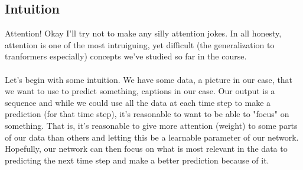 \documentclass[12pt]{article}
\begin{document}
\subsection{Intuition}
Attention! Okay I'll try not to make any silly attention jokes. In all honesty, attention is 
one of the most intruiguing, yet difficult (the generalization to tranformers especially) 
concepts we've studied so far in the course. 
~\\
~\\
Let's begin with some intuition. We have some data, a picture in our case, that we want 
to use to predict something, captions in our case. Our output is a sequence and while 
we could use all the data at each time step to make a prediction (for that time step), 
it's reasonable to want to be able to "focus" on something. That is, it's reasonable to 
give more attention (weight) to some parts of our data than others and letting this be 
a learnable parameter of our network. Hopefully, our network can then focus on what is 
most relevant in the data to predicting the next time step and make a better prediction 
because of it. 
\end{document}
